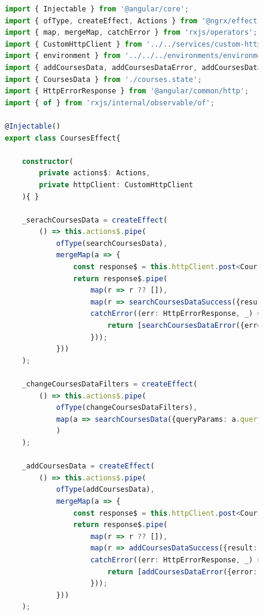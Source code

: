 \begin{figure}[H]
\centering
\begin{lstlisting}[language=TypeScript, linewidth=20cm, basicstyle=\tiny]
import { Injectable } from '@angular/core';
import { ofType, createEffect, Actions } from '@ngrx/effects';
import { map, mergeMap, catchError } from 'rxjs/operators';
import { CustomHttpClient } from '../../services/custom-http-client.service';
import { environment } from '../../../environments/environment';  //  src/environments/environment';
import { addCoursesData, addCoursesDataError, addCoursesDataSuccess, changeCoursesDataFilters, deleteCoursesData, deleteCoursesDataError, deleteCoursesDataSuccess, searchCoursesData, searchCoursesDataError, searchCoursesDataSuccess, updateCoursesData, updateCoursesDataError, updateCoursesDataSuccess,} from './courses.actions';
import { CoursesData } from './courses.state';
import { HttpErrorResponse } from '@angular/common/http';
import { of } from 'rxjs/internal/observable/of';

@Injectable()
export class CoursesEffect{

    constructor(
        private actions$: Actions,
        private httpClient: CustomHttpClient
    ){ }

    _serachCoursesData = createEffect(
        () => this.actions$.pipe(
            ofType(searchCoursesData),
            mergeMap(a => {
                const response$ = this.httpClient.post<CoursesData[]>(`${environment.apiUrl}/courses/searchCoursesData`, a.queryParams, { responseType: 'json'});
                return response$.pipe(
                    map(r => r ?? []),
                    map(r => searchCoursesDataSuccess({result: r, _id: a._id })),
                    catchError((err: HttpErrorResponse, _) => {
                        return [searchCoursesDataError({error: err.message, _id: a._id})];
                    }));
            }))
    );

    _changeCoursesDataFilters = createEffect(
        () => this.actions$.pipe(
            ofType(changeCoursesDataFilters),
            map(a => searchCoursesData({queryParams: a.queryParams, _id: a._id}))
            )
    );

    _addCoursesData = createEffect(
        () => this.actions$.pipe(
            ofType(addCoursesData),
            mergeMap(a => {
                const response$ = this.httpClient.post<CoursesData[]>(`${environment.apiUrl}/courses/addCoursesData`, [a.item], { responseType: 'json'});
                return response$.pipe(
                    map(r => r ?? []),
                    map(r => addCoursesDataSuccess({result: r, _id: a._id })),
                    catchError((err: HttpErrorResponse, _) => {
                        return [addCoursesDataError({error: err.message, _id: a._id})];
                    }));
            }))
    );


\end{lstlisting}
\end{figure}
